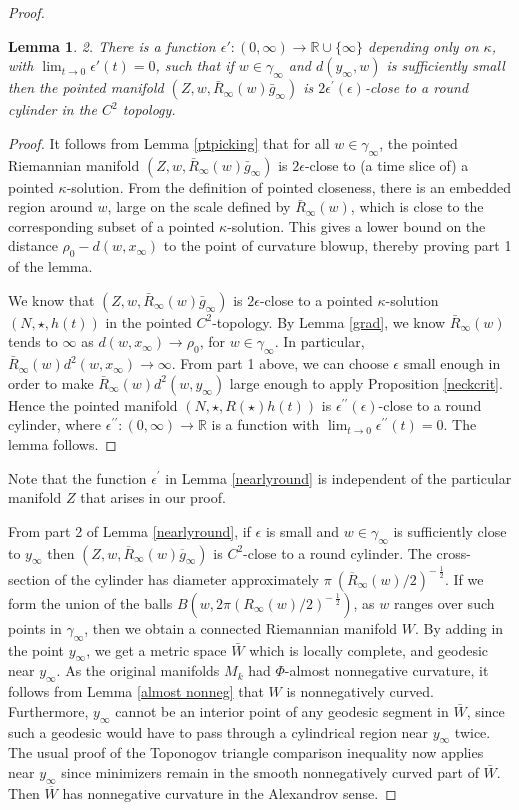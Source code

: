 \documentclass[12pt]{amsart}
\newcommand{\R}{{\mathbb R}}
\newcommand{\eps}{\epsilon}
\newcommand{\ga}{\gamma}
\newcommand{\ra}{\rightarrow}
\numberwithin{equation}{section}
\theoremstyle{plain}
\newtheorem{lemma}[equation]{Lemma}
\theoremstyle{definition}
\theoremstyle{remark}
\begin{document}
\begin{proof}
\begin{lemma}
2. There is a function $\eps':(0,\infty)\ra \R\cup \{\infty\}$ depending only
on $\kappa$, with $\lim_{t\ra 0}\eps'(t)=0$, such that if 
$w\in \ga_\infty$ and $d(y_\infty,w)$ is sufficiently small
then the pointed manifold $(Z,w, \bar R_\infty(w)\bar g_\infty)$ is 
$2\eps^\prime(\epsilon)$-close to a round cylinder in the $C^2$ topology.
\end{lemma}
\begin{proof}
It follows from Lemma \ref{ptpicking} that 
for all $w\in \ga_\infty$, the pointed Riemannian 
manifold
$(Z,w,\bar R_\infty(w)\bar g_\infty)$ is $2\eps$-close
to (a time slice of) a pointed $\kappa$-solution.
From the definition of pointed closeness, there is an
embedded region around $w$, large on the scale defined by 
$\bar R_\infty(w)$, which is close to the corresponding subset of
a pointed $\kappa$-solution.  This gives a lower bound on 
the distance $\rho_0-d(w,x_\infty)$ to the point of curvature
blowup, thereby proving part 1 of the lemma. 

We know that $(Z,w, \bar R_\infty(w) \bar g_\infty)$ is $2\eps$-close to
a pointed $\kappa$-solution $(N,\star,h(t))$ in the pointed
$C^2$-topology.   By Lemma \ref{grad}, 
we know  $\bar R_\infty(w)$ tends to $\infty$
as $d(w,x_\infty)\ra\rho_0$, for $w\in\ga_\infty$.  
In particular, $\bar R_\infty(w)d^2(w,x_\infty)\ra \infty$.
From part 1 above, we can choose $\epsilon$ small enough in order to
make
$\bar R_\infty(w)d^2(w,y_\infty)$ large enough to apply Proposition
\ref{neckcrit}. Hence the pointed
manifold $(N,\star,R(\star)h(t))$ is $\eps^{\prime \prime}(\eps)$-close to
a round cylinder, where $\eps^{\prime \prime}:(0,\infty)\ra\R$ is a function with
$\lim_{t\ra 0}\eps^{\prime \prime}(t)=0$. The lemma follows.
\end{proof}


Note that the function $\epsilon^\prime$ in Lemma
\ref{nearlyround} is independent of the particular manifold
$Z$ that arises in our proof.

From part 2 of Lemma \ref{nearlyround}, if
$\eps$ is small and $ w \in \ga_\infty$ is
sufficiently close to $y_\infty$ then
$(Z, w, \overline{R}_\infty(w) \overline{g}_\infty)$ is 
$C^2$-close to a round cylinder.  The cross-section
of the cylinder has diameter approximately
$\pi \: (\overline{R}_\infty(w)/2)^{- \: \frac12}$. 
If we form the
union of the balls $B(w,2\pi(R_\infty(w)/2)^{- \: \frac{1}{2}})$, as $w$
ranges over such points in $\ga_\infty$, then we obtain a 
connected Riemannian manifold $W$. 
By adding in the point $y_\infty$, we get a
metric space $\bar W$ which is locally complete, and geodesic
near $y_\infty$. As the original manifolds $M_k$ had
$\Phi$-almost nonnegative curvature, it follows
from Lemma \ref{almost nonneg}
that $W$ is
nonnegatively curved.  Furthermore, 
$y_\infty$ cannot be an interior point of any geodesic segment in
$\bar W$, since such a geodesic would have to pass through a cylindrical 
region near $y_\infty$
twice.  The usual
proof of the Toponogov triangle comparison inequality now applies near
$y_\infty$ since
minimizers remain in the smooth nonnegatively curved part of $\bar W$.
Then $\overline{W}$ has nonnegative curvature in the Alexandrov sense.



\end{proof}
\end{document}
